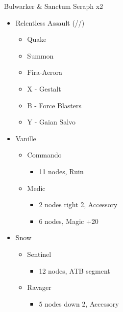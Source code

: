 \begin{multicols}{2}
\begin{battle}{Bulwarker \& Sanctum Seraph x2}
\begin{itemize}
    \item [2] Relentless Assault (\rav/\rav/\com)
    \begin{itemize}
        \item Quake
        \item Summon
        \item Fira-Aerora
        \item X - Gestalt
        \item B - Force Blasters
        \item Y - Gaian Salvo
    \end{itemize}
\end{itemize}
\end{battle}
\vfill
\begin{menu}
\begin{itemize}
    \crystarium
    \begin{itemize}
        \item Vanille
        \begin{itemize}
            \item Commando
            \begin{itemize}
                \item 11 nodes, Ruin
            \end{itemize}
            \item Medic
            \begin{itemize}
                \item 2 nodes right 2, Accessory
                \item 6 nodes, Magic +20
            \end{itemize}
        \end{itemize}
        \item Snow
        \begin{itemize}
            \item Sentinel
            \begin{itemize}
                \item 12 nodes, ATB segment
            \end{itemize}
            \item Ravager
            \begin{itemize}
                \item 5 nodes down 2, Accessory
            \end{itemize}

\end{itemize}
\end{itemize}
\end{itemize}
\end{menu}
\end{multicols}
